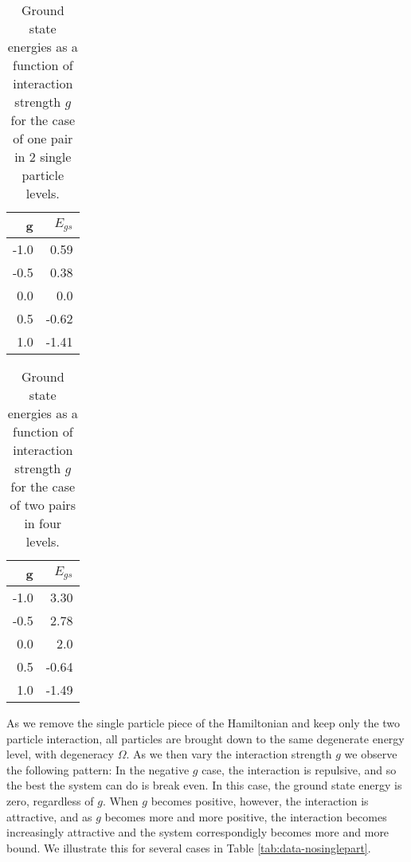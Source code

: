 \documentclass[11pt]{article}
\begin{document}

\begin{table}[h]
\begin{center}
\begin{tabular}{|r|r|}
\hline
  g   &  $E_{gs}$ \\ \hline
-1.0  &  0.59 \\
-0.5  &  0.38 \\
 0.0  &  0.0 \\
 0.5  &  -0.62 \\
 1.0  &  -1.41 \\
\hline
\end{tabular}
\end{center}
\caption{Ground state energies as a function of interaction strength $g$ for the case of one pair in 2 single particle levels.}
\label{tab:1pr2lvl}
\end{table}


\begin{table}[h]
\begin{center}
	\begin{tabular}{|r|r|}
\hline
	g   &  $E_{gs}$ \\ \hline
	-1.0  &  3.30 \\
	-0.5  &  2.78 \\
	 0.0  &  2.0 \\
	 0.5  &  -0.64 \\
	 1.0  &  -1.49 \\
\hline
	\end{tabular}
\end{center}
	\caption{Ground state energies as a function of interaction strength $g$ for the case of two pairs in four levels.}
	\label{tab:2pr4lvl}
\end{table}





As we remove the single particle piece of the Hamiltonian and keep only
the two particle interaction, all particles are brought down to the same
degenerate energy level, with degeneracy $\Omega$. As we then vary the
interaction strength $g$ we observe the following pattern: In the
negative $g$ case, the interaction is repulsive, and so the best the
system can do is break even. In this case, the ground state energy is
zero, regardless of $g$. When $g$ becomes positive, however, the
interaction is attractive, and as $g$ becomes more and more positive,
the interaction becomes increasingly attractive and the system
correspondigly becomes more and more bound. We illustrate this for
several cases in Table \ref{tab:data-nosinglepart}.
\end{document}
